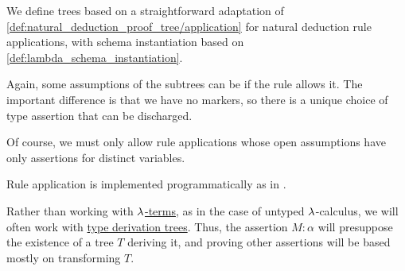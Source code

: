 \begin{definition}
\begin{thmenum}[resume=def:type_derivation_tree]
     We define  trees based on a straightforward adaptation of \cref{def:natural_deduction_proof_tree/application} for natural deduction rule applications, with schema instantiation based on \cref{def:lambda_schema_instantiation}.

    Again, some assumptions of the subtrees can be  if the rule allows it. The important difference is that we have no markers, so there is a unique choice of type assertion that can be discharged.

    Of course, we must only allow rule applications whose open assumptions have only assertions for distinct variables.
  \end{thmenum}
\end{definition}
\begin{comments}
  \item Rule application is implemented programmatically as  in \cite{notebook:code}.
\end{comments}

\begin{remark}\label{rem:type_derivation_tree_focus}
  Rather than working with \hyperref[def:lambda_term]{\( {\mathrm \lambda} \)-terms}, as in the case of untyped \( {\mathrm \lambda} \)-calculus, we will often work with \hyperref[def:type_derivation_tree]{type derivation trees}. Thus, the assertion \( M: \alpha \) will presuppose the existence of a tree \( T \) deriving it, and proving other assertions will be based mostly on transforming \( T \).
\end{remark}

